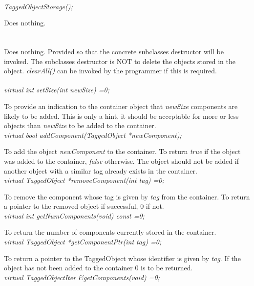  \\
{\em TaggedObjectStorage();} 

Does nothing.\\

 \\
 \\ 
Does nothing. Provided so that the concrete subclasses destructor will
be invoked. The subclasses destructor is NOT to delete the objects
stored in the object. {\em clearAll()} can be invoked by the
programmer if this is required. \\

 \\
{\em virtual int setSize(int newSize) =0;}

To provide an indication to the container object that {\em newSize}
components are likely to be added. This is only a hint, it should be
acceptable for more or less objects than {\em newSize} to be added to
the container. \\

{\em virtual bool addComponent(TaggedObject *newComponent);}

To add the object {\em newComponent} to the container. To return
{\em true} if the object was added to the container, {\em false}
otherwise. The object should not be added if another object with a
similar tag already exists in the container.\\
 
{\em virtual TaggedObject *removeComponent(int tag) =0;}

To remove the component whose tag is given by {\em tag} from the
container. To return a pointer to the removed object if successful,
$0$ if not.\\ 

{\em virtual int  getNumComponents(void) const =0;}

To return the number of components currently stored in the container. \\

{\em virtual TaggedObject *getComponentPtr(int tag) =0;}

To return a pointer to the TaggedObject whose identifier is given by
{\em tag}. If the object has not been added to the container $0$ is to
be returned. \\

{\em virtual TaggedObjectIter \&getComponents(void) =0;}

